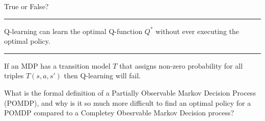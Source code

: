 \documentclass[12pt]{exam}
\newif\ifanswers
\begin{document}

\begin{question}{4}
  True or False?
  \vspace{\baselineskip}
  \begin{subquestion}
\rule{1cm}{0.15mm} Q-learning can learn the optimal Q-function $Q^*$ without ever executing the optimal policy.
  \end{subquestion}
  \vspace{\baselineskip}
  \begin{subquestion}
\rule{1cm}{0.15mm} If an MDP has a transition model $T$ that assigns non-zero probability for all triples $T (s, a, s')$
then Q-learning will fail.
\end{subquestion}
\end{question}


\begin{question}{16}
  What is the formal definition of a Partially Observable Markov Decision Process (POMDP), and why is it so much more difficult to find an optimal policy for a POMDP compared to a Completey Obesrvable Markov Decision process?
  \begin{minipage}[t][5in]{\linewidth}
    \ifanswers
    Put answer here
    \fi
  \end{minipage}

\end{question}
\end{document}
